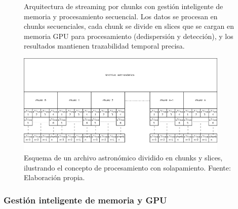 \begin{figure}[H]
{%
}
\caption[Arquitectura de streaming]{Arquitectura de streaming por chunks con gestión inteligente de memoria y procesamiento secuencial. Los datos se procesan en chunks secuenciales, cada chunk se divide en slices que se cargan en memoria GPU para procesamiento (dedispersión y detección), y los resultados mantienen trazabilidad temporal precisa.}
\label{fig:streaming-architecture}
\end{figure}

\begin{figure}[H] 
\centering 
\includegraphics[width=0.9\textwidth]{figures/sistema-chunks.png}
\caption[Esquema de chunks y slices]{Esquema de un archivo astronómico dividido en chunks y slices, ilustrando el concepto de procesamiento con solapamiento. Fuente: Elaboración propia.}
\label{fig:sistema-chunks}
\end{figure}

\subsubsection{Gestión inteligente de memoria y GPU}\label{sec:gpu-memory}

